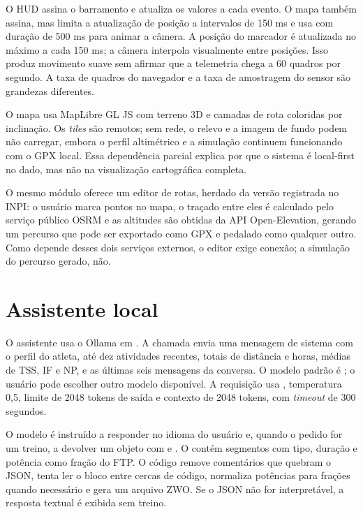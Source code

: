 O HUD assina o barramento e atualiza os valores a cada evento. O mapa também
assina, mas limita a atualização de posição a intervalos de 150 ms e usa
 com duração de 500 ms para animar a câmera. A posição do marcador
é atualizada no máximo a cada 150 ms; a câmera interpola visualmente entre
posições. Isso produz movimento suave sem afirmar que a telemetria chega a 60
quadros por segundo. A taxa de quadros do navegador e a taxa de amostragem do
sensor são grandezas diferentes.

O mapa usa MapLibre GL JS com terreno 3D e camadas de rota coloridas por
inclinação. Os \textit{tiles} são remotos; sem rede, o relevo e a imagem de
fundo podem não carregar, embora o perfil altimétrico e a simulação continuem
funcionando com o GPX local. Essa dependência parcial explica por que o sistema
é local-first no dado, mas não na visualização cartográfica completa.

O mesmo módulo oferece um editor de rotas, herdado da versão registrada no
INPI: o usuário marca pontos no mapa, o traçado entre eles é calculado pelo
serviço público OSRM e as altitudes são obtidas da API Open-Elevation, gerando
um percurso que pode ser exportado como GPX e pedalado como qualquer outro.
Como depende desses dois serviços externos, o editor exige conexão; a
simulação do percurso gerado, não.

\section{Assistente local}
\label{sec:implementacao-ia}

O assistente usa o Ollama em . A chamada envia uma
mensagem de sistema com o perfil do atleta, até dez atividades recentes, totais
de distância e horas, médias de TSS, IF e NP, e as últimas seis mensagens da
conversa. O modelo padrão é ; o usuário pode escolher outro
modelo disponível. A requisição usa , temperatura 0,5,
limite de 2048 tokens de saída e contexto de 2048 tokens, com \textit{timeout}
de 300 segundos.

O modelo é instruído a responder no idioma do usuário e, quando o pedido for um
treino, a devolver um objeto com  e . O
 contém segmentos com tipo, duração e potência como fração do
FTP. O código remove comentários que quebram o JSON, tenta ler o bloco entre
cercas de código, normaliza potências para frações quando necessário e gera um
arquivo ZWO. Se o JSON não for interpretável, a resposta textual é exibida sem
treino.

